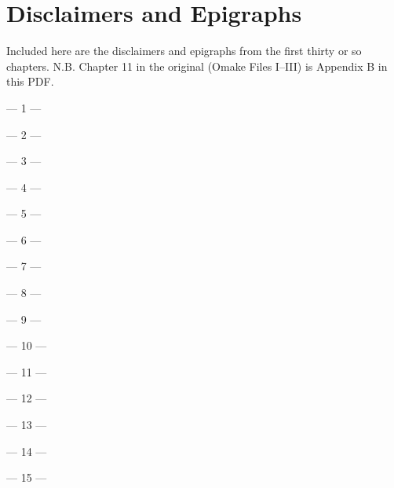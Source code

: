 \chapter{Disclaimers and Epigraphs}

Included here are the disclaimers and epigraphs from the first thirty or so chapters. N.B. Chapter 11 in the original (Omake Files I–III) is Appendix B in this PDF.

{%
\setlength{\parindent}{0pt}
\setlength{\parskip}{1em}

\filbreak
--- 1 ---



\filbreak
--- 2 ---



\filbreak
--- 3 ---



\filbreak
--- 4 ---



\filbreak
--- 5 ---



\filbreak
--- 6 ---



\filbreak
--- 7 ---



\filbreak
--- 8 ---



\filbreak
--- 9 ---



\filbreak
--- 10 ---



\filbreak
--- 11 ---



\filbreak
--- 12 ---


\filbreak
--- 13 ---



\filbreak
--- 14 ---



\filbreak
--- 15 ---



}
